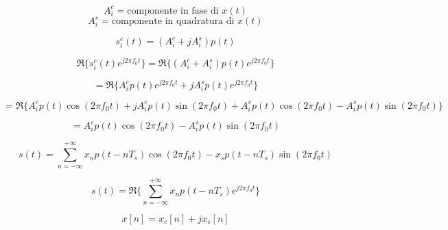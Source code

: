 \[
    A^c_i = \text{componente in fase di } x(t)
\]
\[
    A^s_i = \text{componente in quadratura di } x(t)
\]

\[
    s^c_i(t) = (A^c_i + j A^s_i) p(t)
\]

\[
    \Re\{s^c_i(t) e^{j2\pi f_0t}\} = \Re\{(A^c_i + A^s_i) p(t) e^{j2\pi f_0t}\}
\]

\[
    = \Re\{A^c_i p(t) e^{j2\pi f_0t} + j A^s_i p(t) e^{j2\pi f_0t}\}
\]

\[
    = \Re\{A^c_i p(t) \cos(2\pi f_0t) + j A^c_i p(t) \sin(2\pi f_0t) + A^s_i p(t) \cos(2\pi f_0t) - A^s_i p(t) \sin(2\pi f_0t)\}
\]

\[
    = A^c_i p(t) \cos(2\pi f_0t) - A^s_i p(t) \sin(2\pi f_0t)
\]

\[
    s(t) = \sum_{n=-\infty}^{+\infty} x_n p(t-nT_s) \cos(2\pi f_0t) - x_s p(t-nT_s) \sin(2\pi f_0t)
\]

\[
    s(t) = \Re\{\sum_{n=-\infty}^{+\infty} x_n p(t-nT_s)e^{j2\pi f_0 t}\}
\]

\[
    x[n] = x_c[n] + jx_s[n]
\]

